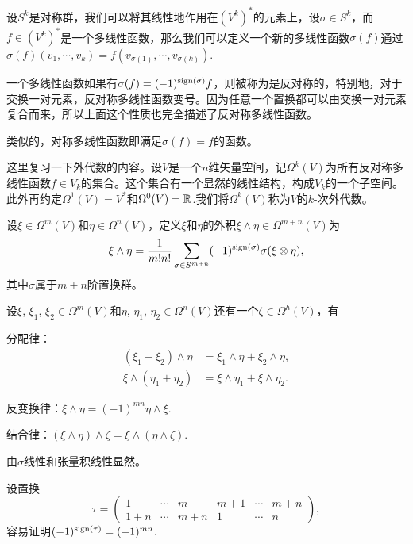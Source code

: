 \para 设$S^k$是对称群，我们可以将其线性地作用在$(V^k)^*$的元素上，设$\sigma\in S^k$，而$f\in (V^k)^*$是一个多线性函数，那么我们可以定义一个新的多线性函数$\sigma(f)$通过$\sigma(f)(v_1,\cdots,v_k)=f(v_{\sigma(1)},\cdots,v_{\sigma(k)})$.

一个多线性函数如果有$\sigma(f)=(-1)^{\operatorname{sign}(\sigma)}f$，则被称为是反对称的，特别地，对于交换一对元素，反对称多线性函数变号。因为任意一个置换都可以由交换一对元素复合而来，所以上面这个性质也完全描述了反对称多线性函数。

类似的，对称多线性函数即满足$\sigma(f)=f$的函数。

\para 这里复习一下外代数的内容。设$V$是一个$n$维矢量空间，记$\Omega^k(V)$为所有反对称多线性函数$f\in V_k$的集合。这个集合有一个显然的线性结构，构成$V_k$的一个子空间。此外再约定$\Omega^1(V)=V^*$和$\Omega^0(V)=\mathbb{R}$.我们将$\Omega^k(V)$称为$V$的$k$-次外代数。

\para 	设$\xi \in \Omega^m(V)$和$\eta \in \Omega^n(V)$，定义$\xi$和$\eta$的外积$\xi \wedge \eta \in \Omega^{m+n}(V)$为
	\[
		\xi \wedge \eta=\frac{1}{m!n!}\sum_{\sigma\in S^{m+n}}(-1)^{\operatorname{sign}(\sigma)}\sigma (\xi \otimes \eta),
	\]
	其中$\sigma$属于$m+n$阶置换群。

\pro 设$\xi$, $\xi_1$, $\xi_2 \in \Omega^m(V)$和$\eta$, $\eta_1$, $\eta_2\in \Omega^n(V)$还有一个$\zeta\in \Omega^h(V)$，有

	分配律：
	\[
		\begin{split}
			(\xi_1+\xi_2)\wedge \eta&=\xi_1 \wedge \eta+\xi_2 \wedge \eta, \\
			\xi \wedge (\eta_1+\eta_2)&=\xi \wedge \eta_1+\xi \wedge \eta_2.
		\end{split}
	\]

	反变换律：$\xi \wedge \eta=(-1)^{mn}\eta \wedge \xi$.

	结合律：$(\xi \wedge \eta)\wedge \zeta=\xi \wedge (\eta\wedge \zeta)$.

\proof {} 由$\sigma$线性和张量积线性显然。

	 设置换
	\[
		\tau=
		\begin{pmatrix}
			1& \cdots & m & m+1 &\cdots &m+n\\
			1+n& \cdots & m+n & 1 &\cdots &n
		\end{pmatrix},
	\]
	容易证明$(-1)^{\operatorname{sign}(\tau)}=(-1)^{mn}$.

